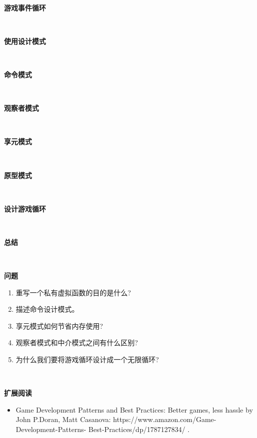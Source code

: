 \noindent\textbf{}\ \par
\textbf{游戏事件循环} \ \par

\noindent\textbf{}\ \par
\textbf{使用设计模式} \ \par

\noindent\textbf{}\ \par
\textbf{命令模式} \ \par

\noindent\textbf{}\ \par
\textbf{观察者模式} \ \par

\noindent\textbf{}\ \par
\textbf{享元模式} \ \par

\noindent\textbf{}\ \par
\textbf{原型模式} \ \par

\noindent\textbf{}\ \par
\textbf{设计游戏循环} \ \par

\noindent\textbf{}\ \par
\textbf{总结} \ \par

\noindent\textbf{}\ \par
\textbf{问题} \ \par
\begin{enumerate}
	\item 重写一个私有虚拟函数的目的是什么?
	\item 描述命令设计模式。
	\item 享元模式如何节省内存使用?
	\item 观察者模式和中介模式之间有什么区别?
	\item 为什么我们要将游戏循环设计成一个无限循环?
\end{enumerate}

\noindent\textbf{}\ \par
\textbf{扩展阅读} \ \par
\begin{itemize}
	\item Game Development Patterns and Best Practices: Better games, less hassle by John P.Doran, Matt Casanova:  https:/​/​www.​amazon.​com/​Game-​Development-​Patterns-	Best-​Practices/​dp/​1787127834/​ .
\end{itemize}

\newpage










